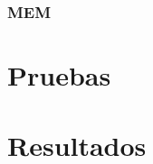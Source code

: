 \subsection{MEM}















\chapter{Pruebas}
\label{cap:pruebas}

\chapter{Resultados}
\label{cap:resultados}
